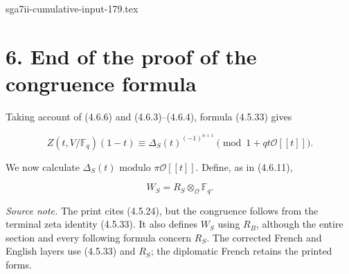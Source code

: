 \begin{filecontents*}{sga7ii-cumulative-input-179.tex}
\section*{6. End of the proof of the congruence formula}

Taking account of (4.6.6) and (4.6.3)--(4.6.4), formula (4.5.33) gives

\begin{equation}\tag{6.0.1}
Z(t,V/\mathbb F_q)(1-t)
\equiv\Delta_S(t)^{(-1)^{n+1}}
\pmod{1+qt\mathcal O[[t]]}.
\end{equation}

We now calculate $\Delta_S(t)$ modulo $\pi\mathcal O[[t]]$.  Define, as in
(4.6.11),

\begin{equation}\tag{6.0.2}
W_S=R_S\otimes_{\mathcal O}\mathbb F_q.
\end{equation}

\medskip
\noindent\emph{Source note.}
The print cites (4.5.24), but the congruence follows from the terminal zeta
identity (4.5.33).  It also defines $W_S$ using $R_B$, although the entire
section and every following formula concern $R_S$.  The corrected French
and English layers use (4.5.33) and $R_S$; the diplomatic French retains
the printed forms.
\end{filecontents*}
